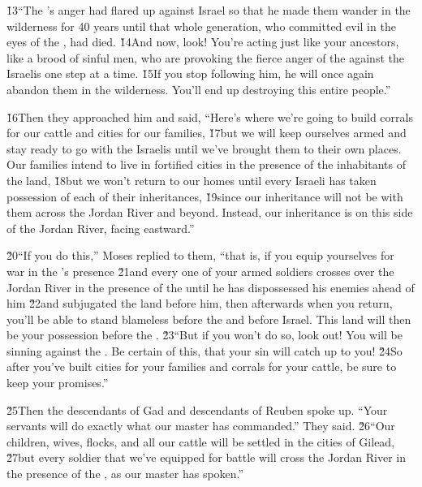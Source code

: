 \v{13}``The 's anger had flared up against Israel so that he made them wander in the wilderness for 40 years until that whole generation, who committed evil in the eyes of the , had died. \v{14}And now, look! You're acting just like your ancestors, like a brood of sinful men, who are provoking the fierce anger of the  against the Israelis one step at a time. \v{15}If you stop following him, he will once again abandon them in the wilderness. You'll end up destroying this entire people.''

\v{16}Then they approached him and said, ``Here's where we're going to build corrals for our cattle and cities for our families, \v{17}but we will keep ourselves armed and stay ready to go with the Israelis until we've brought them to their own places. Our families intend to live in fortified cities in the presence of the inhabitants of the land, \v{18}but we won't return to our homes until every Israeli has taken possession of each of their inheritances, \v{19}since our inheritance will not be with them across the Jordan River and beyond. Instead, our inheritance is on this side of the Jordan River, facing eastward.''

\v{20}``If you do this,'' Moses replied to them, ``that is, if you equip yourselves for war in the 's presence \v{21}and every one of your armed soldiers crosses over the Jordan River in the presence of the  until he has dispossessed his enemies ahead of him \v{22}and subjugated the land before him, then afterwards when you return, you'll be able to stand blameless before the  and before Israel. This land will then be your possession before the . \v{23}``But if you won't do so, look out! You will be sinning against the . Be certain of this, that your sin will catch up to you! \v{24}So after you've built cities for your families and corrals for your cattle, be sure to keep your promises.''

\v{25}Then the descendants of Gad and descendants of Reuben spoke up. ``Your servants will do exactly what our master has commanded.'' They said. \v{26}``Our children, wives, flocks, and all our cattle will be settled in the cities of Gilead, \v{27}but every soldier that we've equipped for battle will cross the Jordan River in the presence of the , as our master has spoken.''


